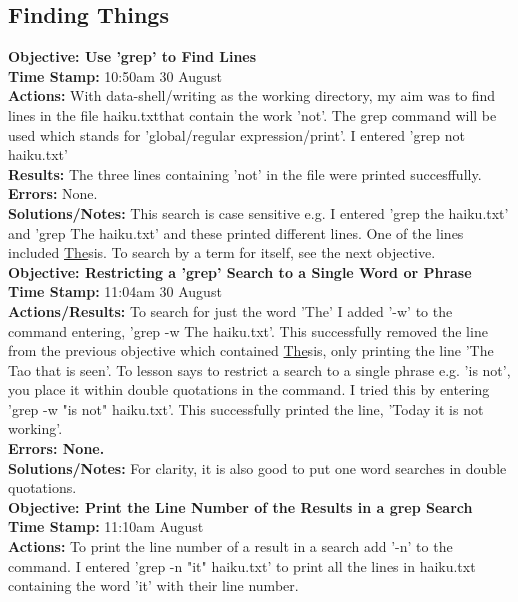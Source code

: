 \documentclass{article}
\begin{document}
\begin{FlushLeft}
\subsection{Finding Things}
\textbf{Objective: Use 'grep' to Find Lines}\\ 
\textbf{Time Stamp:} 10:50am 30 August\\
\textbf{Actions:} With data-shell/writing as the working directory, my aim was to find lines in the file haiku.txtthat contain the work 'not'. The grep command will be used which stands for 'global/regular expression/print'. I entered 'grep not haiku.txt'\\
\textbf{Results:} The three lines containing 'not' in the file were printed succesffully. \\
\textbf{Errors:} None.\\
\textbf{Solutions/Notes:} This search is case sensitive e.g. I entered 'grep the haiku.txt' and 'grep The haiku.txt' and these printed different lines. One of the lines included \underline{The}sis. To search by a term for itself, see the next objective.\\
\vspace{5mm}
\textbf{Objective: Restricting a 'grep' Search to a Single Word or Phrase}\\ 
\textbf{Time Stamp:} 11:04am 30 August\\
\textbf{Actions/Results:} To search for just the word 'The' I added '-w' to the command entering, 'grep -w The haiku.txt'. This successfully removed the line from the previous objective which contained \underline{The}sis, only printing the line 'The Tao that is seen'. To lesson says to restrict a search to a single phrase e.g. 'is not', you place it within double quotations in the command. I tried this by entering 'grep -w "is not" haiku.txt'. This successfully printed the line, 'Today it is not working'.\\
\textbf{Errors: None.} \\
\textbf{Solutions/Notes:} For clarity, it is also good to put one word searches in double quotations.\\
\vspace{5mm}
\textbf{Objective: Print the Line Number of the Results in a grep Search}\\ 
\textbf{Time Stamp:} 11:10am  August\\
\textbf{Actions:} To print the line number of a result in a search add '-n' to the command. I entered 'grep -n "it" haiku.txt' to print all the lines in haiku.txt containing the word 'it' with their line number.\\

\end{FlushLeft}
\end{document}

